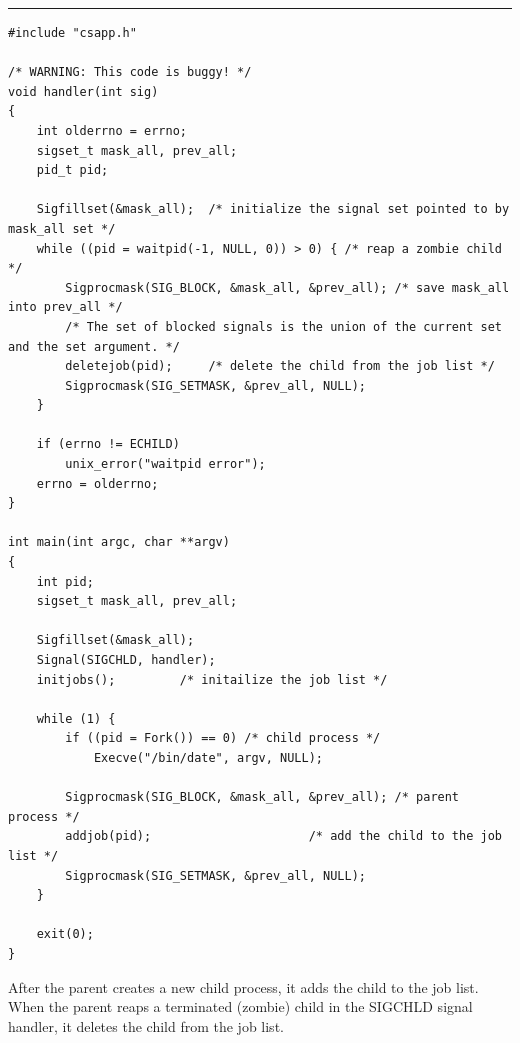 \documentclass[11pt]{article}
\begin{document}
\noindent\rule{\textwidth}{0.5pt}
\begin{verbatim}
#include "csapp.h"

/* WARNING: This code is buggy! */
void handler(int sig)
{
    int olderrno = errno;
    sigset_t mask_all, prev_all;
    pid_t pid;

    Sigfillset(&mask_all);	/* initialize the signal set pointed to by mask_all set */
    while ((pid = waitpid(-1, NULL, 0)) > 0) { /* reap a zombie child */
        Sigprocmask(SIG_BLOCK, &mask_all, &prev_all); /* save mask_all into prev_all */
        /* The set of blocked signals is the union of the current set and the set argument. */
        deletejob(pid);		/* delete the child from the job list */
        Sigprocmask(SIG_SETMASK, &prev_all, NULL);
    }

    if (errno != ECHILD)
        unix_error("waitpid error");
    errno = olderrno;
}

int main(int argc, char **argv)
{
    int pid;
    sigset_t mask_all, prev_all;

    Sigfillset(&mask_all);
    Signal(SIGCHLD, handler);
    initjobs();			/* initailize the job list */

    while (1) {
        if ((pid = Fork()) == 0) /* child process */
            Execve("/bin/date", argv, NULL);

        Sigprocmask(SIG_BLOCK, &mask_all, &prev_all); /* parent process */
        addjob(pid);				      /* add the child to the job list */
        Sigprocmask(SIG_SETMASK, &prev_all, NULL);
    }

    exit(0);
}

\end{verbatim}

After the parent creates a new child process, it adds the child to the job list. When the parent reaps a terminated (zombie) child in the SIGCHLD signal handler, it deletes the child from the job list.\\
\end{document}

